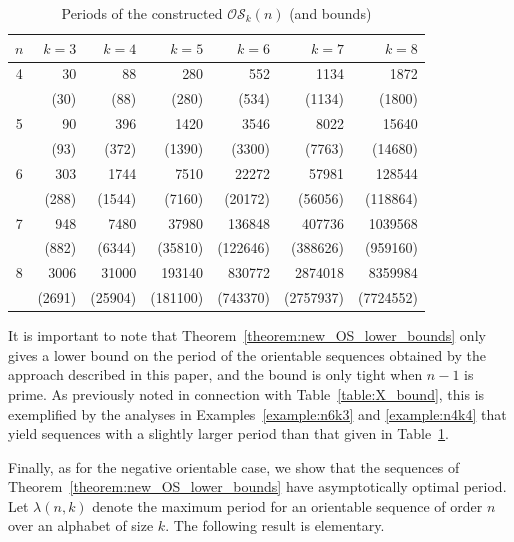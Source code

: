 \documentclass[a4paper,11pt]{article}
\theoremstyle{plain}
\theoremstyle{definition}
\theoremstyle{remark}
\begin{document}
\begin{table}[htb]
\centering \caption{Periods of the constructed $\mathcal{OS}_k(n)$ (and bounds)}
\label{table:OS_Xkn-1_periods}

\begin{tabular}{c|rrrrrr} \hline
$n$ & $k=3$   & $k=4$    & $k=5$    & $k=6$    & $k=7$     & $k=8$     \\ \hline
4   & 30      & 88       & 280      & 552      & 1134      & 1872      \\
    & (30)    & (88)     & (280)    & (534)    & (1134)    & (1800)    \\ \hline
5   & 90      & 396      & 1420     & 3546     & 8022      & 15640     \\
    & (93)    & (372)    & (1390)   & (3300)   & (7763)    & (14680)   \\ \hline
6   & 303     & 1744     & 7510     & 22272    & 57981     & 128544    \\
    & (288)   & (1544)   & (7160)   & (20172)  & (56056)   & (118864)  \\ \hline
7   & 948     & 7480     & 37980    & 136848   & 407736    & 1039568   \\
    & (882)   & (6344)   & (35810)  & (122646) & (388626)  &(959160)   \\ \hline
8   & 3006    & 31000    & 193140   & 830772   & 2874018   & 8359984   \\
    & (2691)  & (25904)  & (181100) & (743370) & (2757937) & (7724552) \\ \hline
\end{tabular}

\end{table}

It is important to note that Theorem~\ref{theorem:new_OS_lower_bounds} only gives a lower bound on
the period of the orientable sequences obtained by the approach described in this paper, and the
bound is only tight when $n-1$ is prime.  As previously noted in connection with
Table~\ref{table:X_bound}, this is exemplified by the analyses in Examples~\ref{example:n6k3} and
\ref{example:n4k4} that yield sequences with a slightly larger period than that given in
Table~\ref{table:OS_Xkn-1_periods}.



Finally, as for the negative orientable case, we show that the sequences of
Theorem~\ref{theorem:new_OS_lower_bounds} have asymptotically optimal period.  Let $\lambda(n,k)$
denote the maximum period for an orientable sequence of order $n$ over an alphabet of size $k$. The
following result is elementary.
\end{document}
